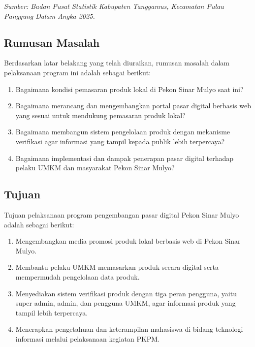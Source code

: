 \documentclass[12pt,a4paper]{article}
\begin{document}
\noindent\textit{Sumber: Badan Pusat Statistik Kabupaten Tanggamus,
Kecamatan Pulau Panggung Dalam Angka 2025.}


\subsection{Rumusan Masalah}

Berdasarkan latar belakang yang telah diuraikan, rumusan masalah
dalam pelaksanaan program ini adalah sebagai berikut:

\begin{enumerate}[
    leftmargin=1.25cm,
    label=\arabic*.,
    itemsep=0pt,
    topsep=0.2cm
]

    \item Bagaimana kondisi pemasaran produk lokal di Pekon Sinar
    Mulyo saat ini?

    \item Bagaimana merancang dan mengembangkan portal pasar digital
    berbasis web yang sesuai untuk mendukung pemasaran produk lokal?

    \item Bagaimana membangun sistem pengelolaan produk dengan
    mekanisme verifikasi agar informasi yang tampil kepada publik
    lebih terpercaya?

    \item Bagaimana implementasi dan dampak penerapan pasar digital
    terhadap pelaku UMKM dan masyarakat Pekon Sinar Mulyo?

\end{enumerate}


\subsection{Tujuan}

Tujuan pelaksanaan program pengembangan pasar digital Pekon Sinar
Mulyo adalah sebagai berikut:

\begin{enumerate}[
    leftmargin=1.25cm,
    label=\arabic*.,
    itemsep=0pt,
    topsep=0.2cm
]

    \item Mengembangkan media promosi produk lokal berbasis web di
    Pekon Sinar Mulyo.

    \item Membantu pelaku UMKM memasarkan produk secara digital serta
    mempermudah pengelolaan data produk.

    \item Menyediakan sistem verifikasi produk dengan tiga peran
    pengguna, yaitu super admin, admin, dan pengguna UMKM, agar
    informasi produk yang tampil lebih terpercaya.

    \item Menerapkan pengetahuan dan keterampilan mahasiswa di bidang
    teknologi informasi melalui pelaksanaan kegiatan PKPM.

\end{enumerate}
\end{document}
